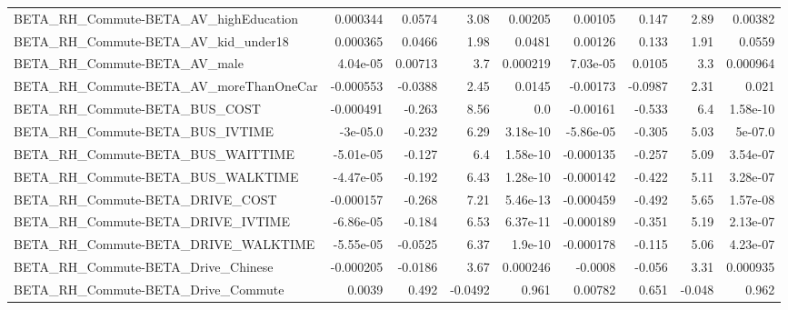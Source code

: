 \begin{tabular}{lrrrrrrrr}
BETA\_RH\_Commute-BETA\_AV\_highEducation              &    0.000344 &       0.0574 &     3.08 &  0.00205 &    0.00105 &       0.147 &         2.89 &       0.00382 \\
BETA\_RH\_Commute-BETA\_AV\_kid\_under18                &    0.000365 &       0.0466 &     1.98 &   0.0481 &    0.00126 &       0.133 &         1.91 &        0.0559 \\
BETA\_RH\_Commute-BETA\_AV\_male                       &    4.04e-05 &      0.00713 &      3.7 & 0.000219 &   7.03e-05 &      0.0105 &          3.3 &      0.000964 \\
BETA\_RH\_Commute-BETA\_AV\_moreThanOneCar             &   -0.000553 &      -0.0388 &     2.45 &   0.0145 &   -0.00173 &     -0.0987 &         2.31 &         0.021 \\
BETA\_RH\_Commute-BETA\_BUS\_COST                      &   -0.000491 &       -0.263 &     8.56 &      0.0 &   -0.00161 &      -0.533 &          6.4 &      1.58e-10 \\
BETA\_RH\_Commute-BETA\_BUS\_IVTIME                    &    -3e-05.0 &       -0.232 &     6.29 & 3.18e-10 &  -5.86e-05 &      -0.305 &         5.03 &       5e-07.0 \\
BETA\_RH\_Commute-BETA\_BUS\_WAITTIME                  &   -5.01e-05 &       -0.127 &      6.4 & 1.58e-10 &  -0.000135 &      -0.257 &         5.09 &      3.54e-07 \\
BETA\_RH\_Commute-BETA\_BUS\_WALKTIME                  &   -4.47e-05 &       -0.192 &     6.43 & 1.28e-10 &  -0.000142 &      -0.422 &         5.11 &      3.28e-07 \\
BETA\_RH\_Commute-BETA\_DRIVE\_COST                    &   -0.000157 &       -0.268 &     7.21 & 5.46e-13 &  -0.000459 &      -0.492 &         5.65 &      1.57e-08 \\
BETA\_RH\_Commute-BETA\_DRIVE\_IVTIME                  &   -6.86e-05 &       -0.184 &     6.53 & 6.37e-11 &  -0.000189 &      -0.351 &         5.19 &      2.13e-07 \\
BETA\_RH\_Commute-BETA\_DRIVE\_WALKTIME                &   -5.55e-05 &      -0.0525 &     6.37 &  1.9e-10 &  -0.000178 &      -0.115 &         5.06 &      4.23e-07 \\
BETA\_RH\_Commute-BETA\_Drive\_Chinese                 &   -0.000205 &      -0.0186 &     3.67 & 0.000246 &    -0.0008 &      -0.056 &         3.31 &      0.000935 \\
BETA\_RH\_Commute-BETA\_Drive\_Commute                 &      0.0039 &        0.492 &  -0.0492 &    0.961 &    0.00782 &       0.651 &       -0.048 &         0.962 \\

\end{tabular}
